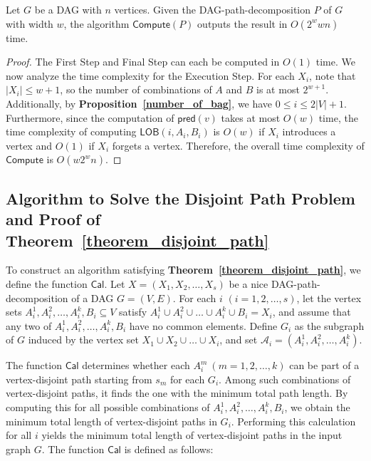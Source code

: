 \documentclass[runningheads]{llncs}
\theoremstyle{plain}
\theoremstyle{definition}
\begin{document}
\begin{lemma}\label{complexity_lob}
    Let $G$ be a DAG with $n$ vertices. Given the DAG-path-decomposition $P$ of $G$ with width $w$, the algorithm $\mathsf{Compute}(P)$ outputs the result in $O(2^w w n)$ time.
\end{lemma}
    
\begin{proof}
    The First Step and Final Step can each be computed in $O(1)$ time. We now analyze the time complexity for the Execution Step. For each $X_i$, note that $|X_i| \leq w+1$, so the number of combinations of $A$ and $B$ is at most $2^{w+1}$. Additionally, by \textbf{Proposition~\ref{number_of_bag}}, we have $0 \leq i \leq 2|V|+1$. Furthermore, since the computation of $\mathsf{pred}(v)$ takes at most $O(w)$ time, the time complexity of computing $\mathsf{LOB}(i, A_i, B_i)$ is $O(w)$ if $X_i$ introduces a vertex and $O(1)$ if $X_i$ forgets a vertex. Therefore, the overall time complexity of $\mathsf{Compute}$ is $O(w 2^w n)$.
\end{proof}












\subsection{Algorithm to Solve the Disjoint Path Problem and Proof of \textbf{Theorem~\ref{theorem_disjoint_path}}}

To construct an algorithm satisfying \textbf{Theorem~\ref{theorem_disjoint_path}}, we define the function $\mathsf{Cal}$. Let $X = (X_1, X_2, \dots, X_s)$ be a nice DAG-path-decomposition of a DAG $G = (V, E)$. For each $i$ $(i = 1, 2, \dots, s)$, let the vertex sets $A^1_i, A^2_i, \dots, A^k_i, B_i \subseteq V$ satisfy $A^1_i \cup A^2_i \cup \dots \cup A^k_i \cup B_i = X_i$, and assume that any two of $A^1_i, A^2_i, \dots, A^k_i, B_i$ have no common elements. Define $G_i$ as the subgraph of $G$ induced by the vertex set $X_1 \cup X_2 \cup \dots \cup X_i$, and set $\mathscr{A}_i = (A^1_i, A^2_i, \dots, A^k_i)$.

The function $\mathsf{Cal}$ determines whether each $A^m_i\ (m=1, 2, \dots, k)$ can be part of a vertex-disjoint path starting from $s_m$ for each $G_i$. Among such combinations of vertex-disjoint paths, it finds the one with the minimum total path length. By computing this for all possible combinations of $A^1_i, A^2_i, \dots, A^k_i, B_i$, we obtain the minimum total length of vertex-disjoint paths in $G_i$. Performing this calculation for all $i$ yields the minimum total length of vertex-disjoint paths in the input graph $G$. The function $\mathsf{Cal}$ is defined as follows:
\end{document}

